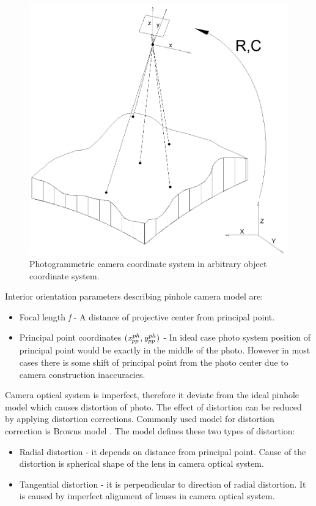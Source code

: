 \documentclass[a4paper,12pt]{article}
\newcommand{\escal}[1]{
{\it #1}
}
\begin{document}
\begin{figure}[h]
    \centering
    \includegraphics[scale=0.3]{figures/photogrammetric_model.png}
    \caption{Photogrammetric camera coordinate system in arbitrary object coordinate system.}
    \label{fig:ph_model}
\end{figure}

Interior orientation parameters describing pinhole camera model are:
\begin{itemize}
  \item Focal length \escal{f} - A distance of projective center from principal point.
  \item Principal point coordinates $(\escal{x}^{ph}_{pp}, \escal{y}^{ph}_{pp})$ - In ideal case photo system position of principal point would be exactly in the middle 
	of the photo.  However in most cases there is some shift of principal point from the photo center due to
	camera construction inaccuracies.
\end{itemize}

Camera optical system is imperfect, therefore it deviate from the ideal pinhole model which 
 causes distortion of photo.
The effect of distortion can be reduced by applying distortion corrections. Commonly 
used model for distortion correction is Browns model \cite{brown1966distortion}.
The model defines these two types of distortion:
\begin{itemize}
  \item Radial distortion - it depends on distance from principal point. Cause of the distortion is spherical shape of the 
  lens in camera optical system.
  \item Tangential distortion - it is perpendicular to direction of radial distortion. It is caused by 
       imperfect alignment of lenses in camera optical system.
\end{itemize}
\end{document}
